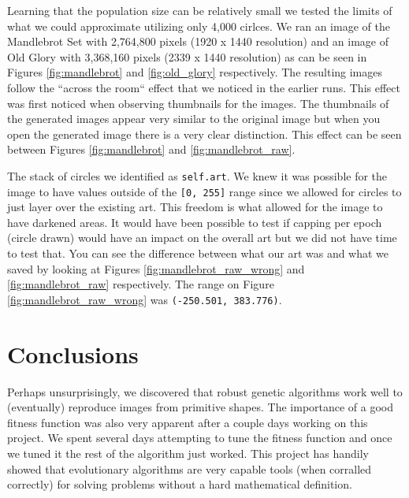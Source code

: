 \documentclass[12pt]{article}
\begin{document}
Learning that the population size can be relatively small we tested the limits of what we could approximate utilizing only 4,000 cirlces. We ran an image of the Mandlebrot Set with 2,764,800 pixels (1920 x 1440 resolution) and an image of Old Glory with 3,368,160 pixels (2339 x 1440 resolution) as can be seen in Figures \ref{fig:mandlebrot} and \ref{fig:old_glory} respectively. The resulting images follow the ``across the room`` effect that we noticed in the earlier runs. This effect was first noticed when observing thumbnails for the images. The thumbnails of the generated images appear very similar to the original image but when you open the generated image there is a very clear distinction. This effect can be seen between Figures \ref{fig:mandlebrot} and \ref{fig:mandlebrot_raw}.

The stack of circles we identified as \texttt{self.art}. We knew it was possible for the image to have values outside of the \texttt{[0, 255]} range since we allowed for circles to just layer over the existing art. This freedom is what allowed for the image to have darkened areas. It would have been possible to test if capping per epoch (circle drawn) would have an impact on the overall art but we did not have time to test that. You can see the difference between what our art was and what we saved by looking at Figures \ref{fig:mandlebrot_raw_wrong} and \ref{fig:mandlebrot_raw} respectively. The range on Figure \ref{fig:mandlebrot_raw_wrong} was \texttt{(-250.501, 383.776)}.

\section*{Conclusions}
Perhaps unsurprisingly, we discovered that robust genetic algorithms work well to (eventually) reproduce images from primitive shapes. The importance of a good fitness function was also very apparent after a couple days working on this project. We spent several days attempting to tune the fitness function and once we tuned it the rest of the algorithm just worked. This project has handily showed that evolutionary algorithms are very capable tools (when corralled correctly) for solving problems without a hard mathematical definition. 

\end{document}
